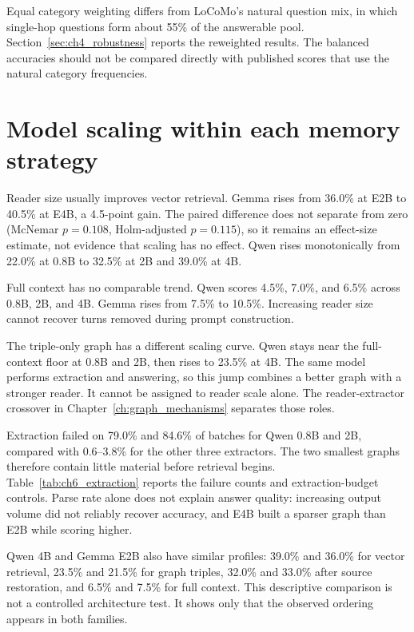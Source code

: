 Equal category weighting differs from LoCoMo's natural question mix, in which single-hop
questions form about 55\% of the answerable pool. Section~\ref{sec:ch4_robustness} reports
the reweighted results. The balanced accuracies should not be compared directly with
published scores that use the natural category frequencies.

\section{Model scaling within each memory strategy}
\label{sec:ch4_scaling}

Reader size usually improves vector retrieval. Gemma rises from 36.0\% at E2B to 40.5\% at E4B, a
4.5-point gain. The paired difference does not separate from zero (McNemar $p=0.108$, Holm-adjusted
$p=0.115$), so it remains an effect-size estimate, not evidence that scaling has no effect. Qwen
rises monotonically from 22.0\% at 0.8B to 32.5\% at 2B and 39.0\% at 4B.

Full context has no comparable trend. Qwen scores 4.5\%, 7.0\%, and 6.5\% across 0.8B, 2B, and 4B.
Gemma rises from 7.5\% to 10.5\%. Increasing reader size cannot recover turns removed during prompt
construction.

The triple-only graph has a different scaling curve. Qwen stays near the full-context floor at 0.8B
and 2B, then rises to 23.5\% at 4B. The same model performs extraction and answering, so this jump
combines a better graph with a stronger reader. It cannot be assigned to reader scale alone. The
reader-extractor crossover in Chapter~\ref{ch:graph_mechanisms} separates those roles.

Extraction failed on 79.0\% and 84.6\% of batches for Qwen 0.8B and 2B, compared with
0.6--3.8\% for the other three extractors. The two smallest graphs therefore contain
little material before retrieval begins. Table~\ref{tab:ch6_extraction} reports the
failure counts and extraction-budget controls. Parse rate alone does not explain answer
quality: increasing output volume did not reliably recover accuracy, and E4B built a
sparser graph than E2B while scoring higher.

Qwen 4B and Gemma E2B also have similar profiles: 39.0\% and 36.0\% for vector retrieval, 23.5\%
and 21.5\% for graph triples, 32.0\% and 33.0\% after source restoration, and 6.5\% and 7.5\% for
full context. This descriptive comparison is not a controlled architecture test. It shows only that
the observed ordering appears in both families.

